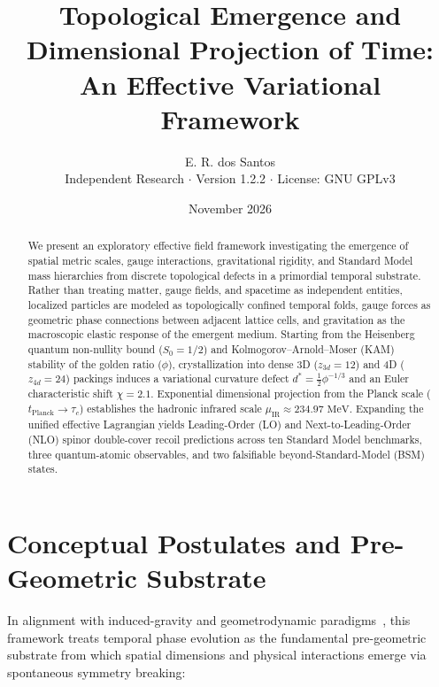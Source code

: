 \documentclass[11pt,a4paper]{article}
\title{\textbf{Topological Emergence and Dimensional Projection of Time:\\
An Effective Variational Framework}}
\author{E. R. dos Santos\\
\small Independent Research $\cdot$ Version 1.2.2 $\cdot$ License: GNU GPLv3}
\date{November 2026}
\begin{document}
\maketitle

\begin{abstract}
We present an exploratory effective field framework investigating the emergence of spatial metric scales, gauge interactions, gravitational rigidity, and Standard Model mass hierarchies from discrete topological defects in a primordial temporal substrate. Rather than treating matter, gauge fields, and spacetime as independent entities, localized particles are modeled as topologically confined temporal folds, gauge forces as geometric phase connections between adjacent lattice cells, and gravitation as the macroscopic elastic response of the emergent medium. Starting from the Heisenberg quantum non-nullity bound ($S_0 = 1/2$) and Kolmogorov--Arnold--Moser (KAM) stability of the golden ratio ($\phi$), crystallization into dense 3D ($z_{3d} = 12$) and 4D ($z_{4d} = 24$) packings induces a variational curvature defect $d^* = \frac{1}{2}\phi^{-1/3}$ and an Euler characteristic shift $\chi = 2.1$. Exponential dimensional projection from the Planck scale ($t_{\text{Planck}} \to \tau_c$) establishes the hadronic infrared scale $\mu_{\text{IR}} \approx 234.97\text{ MeV}$. Expanding the unified effective Lagrangian yields Leading-Order (LO) and Next-to-Leading-Order (NLO) spinor double-cover recoil predictions across ten Standard Model benchmarks, three quantum-atomic observables, and two falsifiable beyond-Standard-Model (BSM) states.
\end{abstract}

\section{Conceptual Postulates and Pre-Geometric Substrate}

In alignment with induced-gravity and geometrodynamic paradigms~\cite{Sakharov1967}, this framework treats temporal phase evolution as the fundamental pre-geometric substrate from which spatial dimensions and physical interactions emerge via spontaneous symmetry breaking:
\end{document}
